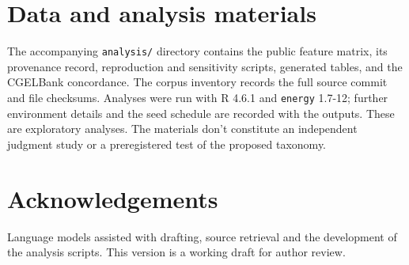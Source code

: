 \documentclass[12pt]{article}
\begin{document}
\section*{Data and analysis materials}

The accompanying \texttt{analysis/} directory contains the public feature matrix, its provenance record, reproduction and sensitivity scripts, generated tables, and the CGELBank concordance. The corpus inventory records the full source commit and file checksums. Analyses were run with R 4.6.1 and \texttt{energy} 1.7-12; further environment details and the seed schedule are recorded with the outputs. These are exploratory analyses. The materials don't constitute an independent judgment study or a preregistered test of the proposed taxonomy.

\section*{Acknowledgements}

Language models assisted with drafting, source retrieval and the development of the analysis scripts. This version is a working draft for author review.

\clearpage
\printbibliography
\end{document}
